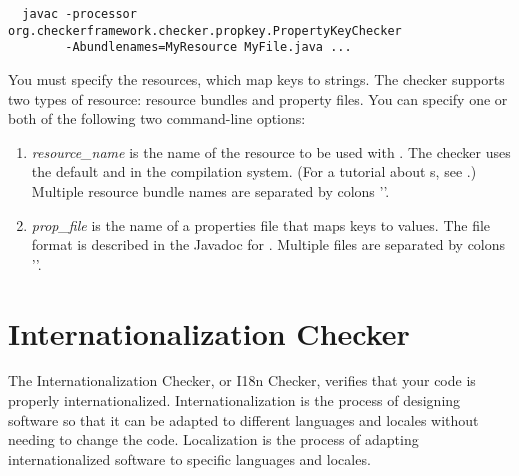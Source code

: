 \begin{Verbatim}
  javac -processor org.checkerframework.checker.propkey.PropertyKeyChecker
        -Abundlenames=MyResource MyFile.java ...
\end{Verbatim}

You must specify the resources, which map keys to strings.
The checker supports two types of resource:
resource bundles and property files.  You can specify one or both of the
following two command-line options:

\begin{enumerate}

\item {}

  \emph{resource\_name} is the name of the resource to be used with
  .
  The checker uses the default  and  in the
  compilation system.
  (For a tutorial about s, see
  .)
  Multiple resource bundle names are separated by colons '\code{:}'.

\item {}

  \emph{prop\_file} is the name of a properties file that maps
  keys to values.  The file format is described in
  the Javadoc for
  .
  Multiple files are separated by colons '\code{:}'.

\end{enumerate}



\section{Internationalization Checker\label{i18n-checker}}

The Internationalization Checker, or I18n Checker, verifies that your code is properly
internationalized.  Internationalization is the process of designing software so that
it can be adapted to different languages and locales without needing to change the code.
Localization is the process of adapting internationalized software to specific languages
and locales.

